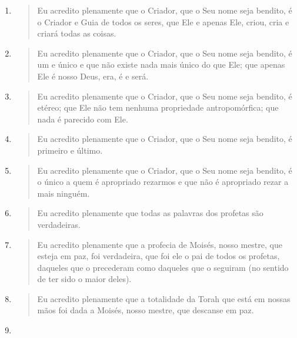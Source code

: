 \begin{enumerate}
\def\labelenumi{\arabic{enumi}.}
\item
 \begin{quote}
 Eu acredito plenamente que o Criador, que o Seu nome seja bendito, é o
 Criador e Guia de todos os seres, que Ele e apenas Ele, criou, cria e
 criará todas as coisas.
 \end{quote}
\item
 \begin{quote}
 Eu acredito plenamente que o Criador, que o Seu nome seja bendito, é
 um e único e que não existe nada mais único do que Ele; que apenas Ele
 é nos­so Deus, era, é e será.
 \end{quote}
\item
 \begin{quote}
 Eu acredito plenamente que o Criador, que o Seu nome seja bendito, é
 eté­reo; que Ele não tem nenhuma propriedade antropomórfica; que nada
 é parecido com Ele.
 \end{quote}
\item
 \begin{quote}
 Eu acredito plenamente que o Criador, que o Seu nome seja bendito, é
 pri­meiro e último.
 \end{quote}
\item
 \begin{quote}
 Eu acredito plenamente que o Criador, que o Seu nome seja bendito, é o
 único a quem é apropriado rezarmos e que não é apropriado rezar a mais
 ninguém.
 \end{quote}
\item
 \begin{quote}
 Eu acredito plenamente que todas as palavras dos profetas são
 verdadeiras.
 \end{quote}
\item
 \begin{quote}
 Eu acredito plenamente que a profecia de Moisés, nosso mestre, que
 esteja em paz, foi verdadeira, que foi ele o pai de todos os profetas,
 daqueles que o precederam como daqueles que o seguiram (no sentido de
 ter sido o maior deles).
 \end{quote}
\item
 \begin{quote}
 Eu acredito plenamente que a totalidade da Torah que está em nossas
 mãos foi dada a Moisés, nosso mestre, que descanse em paz.
 \end{quote}
\item
 \begin{quote}

\end{quote}
\end{enumerate}
